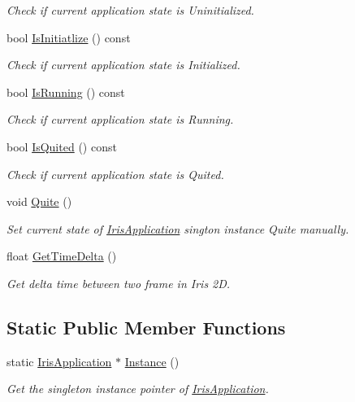 \begin{DoxyCompactItemize}
\begin{DoxyCompactList}\small\item\em Check if current application state is Uninitialized. \end{DoxyCompactList}\item 
bool \hyperlink{class_iris2_d_1_1_iris_application_ab7a5b7f956f23d3fb3d2ee0de573cb53}{Is\+Initiatlize} () const
\begin{DoxyCompactList}\small\item\em Check if current application state is Initialized. \end{DoxyCompactList}\item 
bool \hyperlink{class_iris2_d_1_1_iris_application_a795cea1f5d8112a7db7d6429f306a5ff}{Is\+Running} () const
\begin{DoxyCompactList}\small\item\em Check if current application state is Running. \end{DoxyCompactList}\item 
bool \hyperlink{class_iris2_d_1_1_iris_application_ae9760ff496a4c80f96ad49331407c2e4}{Is\+Quited} () const
\begin{DoxyCompactList}\small\item\em Check if current application state is Quited. \end{DoxyCompactList}\item 
void \hyperlink{class_iris2_d_1_1_iris_application_adca8cada1a8841c3f409e856f6878331}{Quite} ()
\begin{DoxyCompactList}\small\item\em Set current state of \hyperlink{class_iris2_d_1_1_iris_application}{Iris\+Application} sington instance Quite manually. \end{DoxyCompactList}\item 
float \hyperlink{class_iris2_d_1_1_iris_application_a3b8f4de1902aeda08acbe243aad34f15}{Get\+Time\+Delta} ()
\begin{DoxyCompactList}\small\item\em Get delta time between two frame in Iris 2D. \end{DoxyCompactList}\end{DoxyCompactItemize}
\subsection*{Static Public Member Functions}
\begin{DoxyCompactItemize}
\item 
static \hyperlink{class_iris2_d_1_1_iris_application}{Iris\+Application} $\ast$ \hyperlink{class_iris2_d_1_1_iris_application_ab2a9826c10d90732f398859782817f8e}{Instance} ()
\begin{DoxyCompactList}\small\item\em Get the singleton instance pointer of \hyperlink{class_iris2_d_1_1_iris_application}{Iris\+Application}. \end{DoxyCompactList}\end{DoxyCompactItemize}


